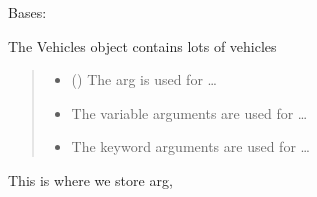 \documentclass[letterpaper,10pt,english]{sphinxmanual}
\begin{document}
\begin{fulllineitems}
\label{\detokenize{_autosummary/module.submodule.dummycode.NumpyVehicle:module.submodule.dummycode.NumpyVehicle}}
\pysigstartsignatures
{}
\pysigstopsignatures
\sphinxAtStartPar
Bases: 

\sphinxAtStartPar
The Vehicles object contains lots of vehicles
\begin{quote}\begin{description}
\begin{itemize}
\item {} 
\sphinxAtStartPar
{} () \textendash{} The arg is used for …

\item {} 
\sphinxAtStartPar
{} \textendash{} The variable arguments are used for …

\item {} 
\sphinxAtStartPar
{} \textendash{} The keyword arguments are used for …

\end{itemize}

\end{description}\end{quote}

\begin{fulllineitems}
\label{\detokenize{_autosummary/module.submodule.dummycode.NumpyVehicle:module.submodule.dummycode.NumpyVehicle.arg}}
\pysigstartsignatures
{}
\pysigstopsignatures
\sphinxAtStartPar
This is where we store arg,
\begin{quote}\begin{description}
\sphinxAtStartPar
{}

\end{description}\end{quote}


\end{fulllineitems}
\end{fulllineitems}
\end{document}
